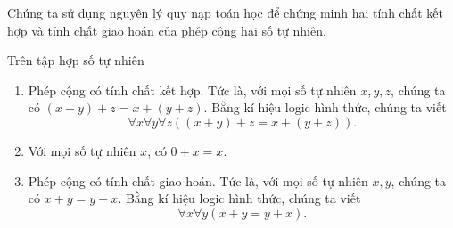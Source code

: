 Chúng ta sử dụng nguyên lý quy nạp toán học để chứng minh hai tính chất kết hợp và tính chất giao hoán của phép cộng hai số tự nhiên.
\begin{theorem}\label{theorem:property-of-natural-numbers-addition}
    Trên tập hợp số tự nhiên
    \begin{enumerate}[label={(\roman*)}]
        \item Phép cộng có tính chất kết hợp. Tức là, với mọi số tự nhiên $x, y, z$, chúng ta có $(x + y) + z = x + (y + z)$. Bằng kí hiệu logic hình thức, chúng ta viết
              \[
                  \forall x\forall y\forall z \left( (x + y) + z = x + (y + z) \right).
              \]
        \item Với mọi số tự nhiên $x$, có $0 + x = x$.
        \item Phép cộng có tính chất giao hoán.  Tức là, với mọi số tự nhiên $x, y$, chúng ta có $x + y = y + x$. Bằng kí hiệu logic hình thức, chúng ta viết
              \[
                  \forall x\forall y \left( x + y = y + x \right).
              \]
    \end{enumerate}
\end{theorem}

